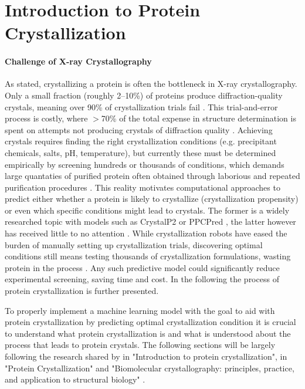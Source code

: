 \section{Introduction to Protein Crystallization}\label{sec:protein_crystallization}

\paragraph{Challenge of X-ray Crystallography}
As stated, crystallizing a protein is often the bottleneck in X-ray crystallography. Only a small fraction (roughly 2–10\%) of proteins produce diffraction-quality crystals, meaning over 90\% of crystallization trials fail \parencite{Mall2025}. This trial-and-error process is costly, where $>$70\% of the total expense in structure determination is spent on attempts not producing crystals of diffraction quality \parencite{Mall2025}. Achieving crystals requires finding the right crystallization conditions (e.g. precipitant chemicals, salts, pH, temperature), but currently these must be determined empirically by screening hundreds or thousands of conditions, which demands large quantaties of purified protein  often obtained through laborious and repeated purification procedures \parencite{McPherson2013}. This reality motivates computational approaches to predict either whether a protein is likely to crystallize (crystallization propensity) or even which specific conditions might lead to crystals. The former is a widely researched topic with models such as CrystalP2 \parencite{Kurgan2009} or PPCPred \parencite{Mizianty2011}, the latter however has received little to no attention \parencite{Jin2022}.  While crystallization robots have eased the burden of manually setting up crystallization trials, discovering optimal conditions still means testing thousands of crystallization formulations, wasting protein in the process \parencite{Wilson2014}.
Any such predictive model could significantly reduce experimental screening, saving time and cost.
In the following the process of protein crystallization is further presented. 

To properly implement a machine learning model with the goal to aid with protein crystallization by predicting optimal crystallization condition it is crucial to understand what protein crystallization is and what is understood about the process that leads to protein crystals. 
The following sections will be largely following the research shared by \citet{McPherson2013} in "Introduction to protein crystallization", \citet{Bergfors2009} in "Protein Crystallization" and "Biomolecular crystallography: principles, practice, and application to structural biology" \parencite{Rupp2009}. 

